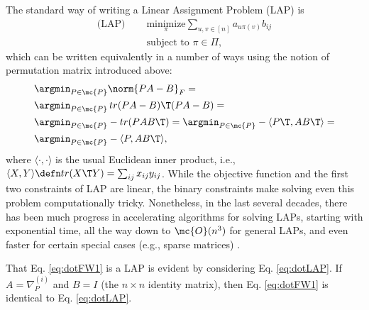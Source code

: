 \documentclass[10pt,journal,cspaper,compsoc]{IEEEtran}
\newcommand{\PmcP}{P \in \mc{P}}
\begin{document}

The standard way of writing a Linear Assignment Problem (LAP) is
\begin{subequations} \label{eq:LAP}
\begin{align}
	 \text{(LAP) }\quad  &\underset{\pi}{\text{minimize}} \sum_{u,v \in [n]} a_{u \pi(v)} b_{ij} \\
	&\text{subject to } \pi \in \Pi,
\end{align}
\end{subequations}
which can be written equivalently in a number of ways using the notion of permutation matrix introduced above:
\begin{subequations} \label{eq:LAP2}
\begin{align}
	&\argmin_{\PmcP} \norm{PA - B}_F =\\
	&\argmin_{\PmcP} \, tr(PA-B)\T (PA-B)=\\ 
	&\argmin_{\PmcP}  -tr (P AB\T) = \argmin_{\PmcP}  -\langle P\T, AB\T \rangle = \label{eq:2c} \\
	&\argmin_{\PmcP}  -\langle P, AB\T \rangle, \label{eq:dotLAP}
\end{align}
\end{subequations}
where $\langle \cdot,\cdot \rangle$ %
is the usual Euclidean inner product, i.e., $\langle X,Y\rangle \defn tr(X\T Y)= \sum_{ij} x_{ij} y_{ij}$.
While the objective function and the first two constraints of LAP are linear, the binary constraints make solving even this problem computationally tricky.  Nonetheless, in the last several decades, there has been much progress in accelerating algorithms for solving LAPs, starting with exponential time, all the way down to $\mc{O}(n^3)$ for general LAPs, and even faster for certain special cases (e.g., sparse matrices) \cite{Jonker1987, Burkard2009}.

That Eq. \eqref{eq:dotFW1} is a LAP is evident by considering Eq. \eqref{eq:dotLAP}.  If $A=\nabla_P^{(i)}$ and $B=I$ (the $n\times n$ identity matrix), then Eq. \eqref{eq:dotFW1} is identical to Eq. \eqref{eq:dotLAP}.
\end{document}
